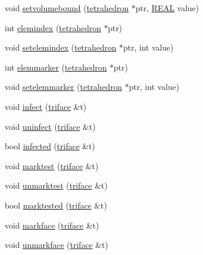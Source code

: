 \begin{DoxyCompactItemize}
\item 
void \hyperlink{classtetgenmesh_a33453f3a5320ecc48f25630a97c5e353}{setvolumebound} (\hyperlink{classtetgenmesh_a6a12b1c0d1834ca941d16c62e949e5e3}{tetrahedron} $\ast$ptr, \hyperlink{tetgen_8h_a4b654506f18b8bfd61ad2a29a7e38c25}{R\+E\+AL} value)
\item 
int \hyperlink{classtetgenmesh_a0a12e21d9d363bc5aef59c1b1e51e5f2}{elemindex} (\hyperlink{classtetgenmesh_a6a12b1c0d1834ca941d16c62e949e5e3}{tetrahedron} $\ast$ptr)
\item 
void \hyperlink{classtetgenmesh_a2cbb9d3c9692a5769ad8e9f20263a3ad}{setelemindex} (\hyperlink{classtetgenmesh_a6a12b1c0d1834ca941d16c62e949e5e3}{tetrahedron} $\ast$ptr, int value)
\item 
int \hyperlink{classtetgenmesh_aea9c7e2e0f281f543c9215dcf4694512}{elemmarker} (\hyperlink{classtetgenmesh_a6a12b1c0d1834ca941d16c62e949e5e3}{tetrahedron} $\ast$ptr)
\item 
void \hyperlink{classtetgenmesh_acb8c694d2d20e494b14b9c9f520cd5c8}{setelemmarker} (\hyperlink{classtetgenmesh_a6a12b1c0d1834ca941d16c62e949e5e3}{tetrahedron} $\ast$ptr, int value)
\item 
void \hyperlink{classtetgenmesh_ad060b1bbcd6b0ce11367b1a4d1be9c75}{infect} (\hyperlink{classtetgenmesh_1_1triface}{triface} \&t)
\item 
void \hyperlink{classtetgenmesh_a3de3aa0353d41c28437b3a77cc9618f8}{uninfect} (\hyperlink{classtetgenmesh_1_1triface}{triface} \&t)
\item 
bool \hyperlink{classtetgenmesh_a26ecd46a8e767042b2bd0a2725ac4a89}{infected} (\hyperlink{classtetgenmesh_1_1triface}{triface} \&t)
\item 
void \hyperlink{classtetgenmesh_a4bf3c95209d98d077cf1d9f23940e897}{marktest} (\hyperlink{classtetgenmesh_1_1triface}{triface} \&t)
\item 
void \hyperlink{classtetgenmesh_ad71dabbbfe63203a68adfe3243e2ce05}{unmarktest} (\hyperlink{classtetgenmesh_1_1triface}{triface} \&t)
\item 
bool \hyperlink{classtetgenmesh_a41b5cf3c9d9eec904982f85cf5651f9a}{marktested} (\hyperlink{classtetgenmesh_1_1triface}{triface} \&t)
\item 
void \hyperlink{classtetgenmesh_aeeb480b609c1913bf2d45cc889a54c7d}{markface} (\hyperlink{classtetgenmesh_1_1triface}{triface} \&t)
\item 
void \hyperlink{classtetgenmesh_abe7f9ab91e674a04397d8d050a7e7eb6}{unmarkface} (\hyperlink{classtetgenmesh_1_1triface}{triface} \&t)
\item 

\end{DoxyCompactItemize}
